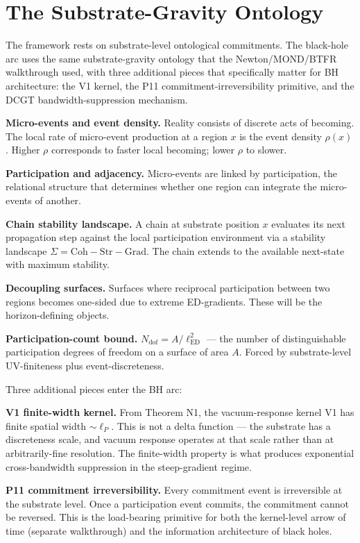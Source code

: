 \documentclass[11pt,a4paper]{article}
\begin{document}
\section{The Substrate-Gravity Ontology}

The framework rests on substrate-level ontological commitments. The black-hole arc uses the same substrate-gravity ontology that the Newton/MOND/BTFR walkthrough used, with three additional pieces that specifically matter for BH architecture: the V1 kernel, the P11 commitment-irreversibility primitive, and the DCGT bandwidth-suppression mechanism.

\textbf{Micro-events and event density.} Reality consists of discrete acts of becoming. The local rate of micro-event production at a region $x$ is the event density $\rho(x)$. Higher $\rho$ corresponds to faster local becoming; lower $\rho$ to slower.

\textbf{Participation and adjacency.} Micro-events are linked by participation, the relational structure that determines whether one region can integrate the micro-events of another.

\textbf{Chain stability landscape.} A chain at substrate position $x$ evaluates its next propagation step against the local participation environment via a stability landscape $\Sigma = \mathrm{Coh} - \mathrm{Str} - \mathrm{Grad}$. The chain extends to the available next-state with maximum stability.

\textbf{Decoupling surfaces.} Surfaces where reciprocal participation between two regions becomes one-sided due to extreme ED-gradients. These will be the horizon-defining objects.

\textbf{Participation-count bound.} $N_{\mathrm{dof}} = A/\ell_{\mathrm{ED}}^2$ --- the number of distinguishable participation degrees of freedom on a surface of area $A$. Forced by substrate-level UV-finiteness plus event-discreteness.

Three additional pieces enter the BH arc:

\textbf{V1 finite-width kernel.} From Theorem N1, the vacuum-response kernel V1 has finite spatial width $\sim \ell_P$. This is not a delta function --- the substrate has a discreteness scale, and vacuum response operates at that scale rather than at arbitrarily-fine resolution. The finite-width property is what produces exponential cross-bandwidth suppression in the steep-gradient regime.

\textbf{P11 commitment irreversibility.} Every commitment event is irreversible at the substrate level. Once a participation event commits, the commitment cannot be reversed. This is the load-bearing primitive for both the kernel-level arrow of time (separate walkthrough) and the information architecture of black holes.
\end{document}
